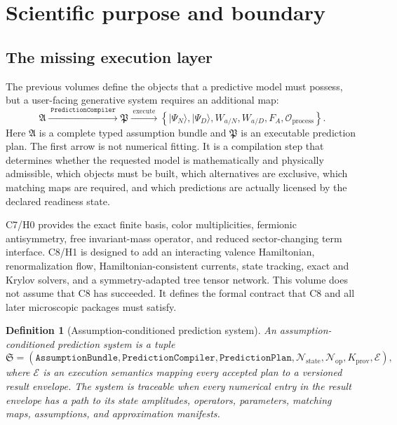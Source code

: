 \documentclass[11pt]{article}
\newtheorem{definition}{Definition}[section]
\newcommand{\cO}{\mathcal O}
\newcommand{\cE}{\mathcal E}
\newcommand{\Aset}{\mathfrak A}
\newcommand{\Pplan}{\mathfrak P}
\newcommand{\Nstate}{\mathcal N_{\mathrm{state}}}
\newcommand{\Nop}{\mathcal N_{\mathrm{op}}}
\newcommand{\Kprov}{K_{\mathrm{prov}}}
\newcommand{\Compiler}{\texttt{PredictionCompiler}}
\newcommand{\AssumptionBundle}{\texttt{AssumptionBundle}}
\newcommand{\PredictionPlan}{\texttt{PredictionPlan}}
\begin{document}
\tableofcontents

\section{Scientific purpose and boundary}
\label{sec:purpose}

\subsection{The missing execution layer}

The previous volumes define the objects that a predictive model must possess,
but a user-facing generative system requires an additional map:
\begin{equation}
 \Aset
 \xrightarrow{\;\Compiler\;}
 \Pplan
 \xrightarrow{\;\mathrm{execute}\;}
 \left\{
 |\Psi_N\rangle,
 |\Psi_D\rangle,
 W_{a/N},W_{a/D},
 F_A,\cO_{\mathrm{process}}
 \right\}.
\label{eq:compiler-chain}
\end{equation}
Here \(\Aset\) is a complete typed assumption bundle and \(\Pplan\) is an
executable prediction plan.  The first arrow is not numerical fitting.  It is a
compilation step that determines whether the requested model is mathematically
and physically admissible, which objects must be built, which alternatives are
exclusive, which matching maps are required, and which predictions are
actually licensed by the declared readiness state.

C7/H0 provides the exact finite basis, color multiplicities, fermionic
antisymmetry, free invariant-mass operator, and reduced sector-changing term
interface.  C8/H1 is designed to add an interacting valence Hamiltonian,
renormalization flow, Hamiltonian-consistent currents, state tracking, exact
and Krylov solvers, and a symmetry-adapted tree tensor network.  This volume
does not assume that C8 has succeeded.  It defines the formal contract that C8
and all later microscopic packages must satisfy.

\begin{definition}[Assumption-conditioned prediction system]
An assumption-conditioned prediction system is a tuple
\begin{equation}
 \mathfrak S=
 \left(
 \AssumptionBundle,
 \Compiler,
 \PredictionPlan,
 \Nstate,
 \Nop,
 \Kprov,
 \cE
 \right),
\label{eq:system-tuple}
\end{equation}
where \(\cE\) is an execution semantics mapping every accepted plan to a
versioned result envelope.  The system is \emph{traceable} when every numerical
entry in the result envelope has a path to its state amplitudes, operators,
parameters, matching maps, assumptions, and approximation manifests.
\end{definition}
\end{document}
